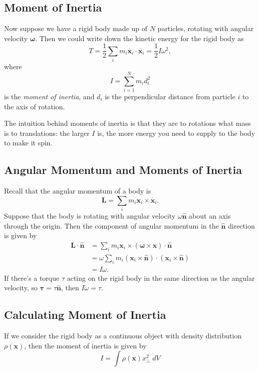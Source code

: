 \documentclass[11pt, a4paper]{scrartcl}
\newcommand{\vv}[1]{\boldsymbol{\mathbf{#1}}}
\theoremstyle{definition}
\newcommand{\vocab}[1]{\emph{#1}}
\newcommand{\hh}[1]{\hat{\vv{#1}}}
\begin{document}
\subsection*{Moment of Inertia}

Now suppose we have a rigid body made up of $N$ particles, rotating with angular velocity $\vv \omega$. Then we could write down the kinetic energy for the rigid body as
$$
T = \frac{1}{2} \sum_{i} m_i  \dot{\vv x_i} \cdot \dot{\vv x_i} = \frac{1}{2}I \omega^2,
$$
where
$$
I = \sum_{i = 1}^N m_i d_i^2
$$
is the \vocab{moment of inertia}, and $d_i$ is the perpendicular distance from particle $i$ to the axis of rotation.

The intuition behind moments of inertia is that they are to rotations what mass is to translations: the larger $I$ is, the more energy you need to supply to the body to make it spin.

\subsection*{Angular Momentum and Moments of Inertia}

Recall that the angular momentum of a body is
$$
\vv L = \sum_i m_i \vv x_i \times  \dot{\vv x_i}.
$$
Suppose that the body is rotating with angular velocity $\omega \hh n$ about an axis through the origin. Then the component of angular momentum in the $\hh n$ direction is given by
\begin{align*}
	\vv L \cdot \hh n &= \sum_i m_i \vv x_i \times (\vv \omega \times \vv x) \cdot \hh n \\
	&= \omega \sum_i m_i (\vv x_i \times \hh n) \cdot (\vv x_i \times \hh n) \\
	&= I \omega.
\end{align*}
If there's a torque $\tau$ acting on the rigid body in the same direction as the angular velocity, so $\vv \tau = \tau \hh n$, then $I \dot{\omega} = \tau$.

\subsection*{Calculating Moment of Inertia}

If we consider the rigid body as a continuous object with density distribution $\rho (\vv x)$, then the moment of inertia is given by
$$
I = \int \rho (\vv x) x_{\perp}^2 \; dV
$$
\end{document}
